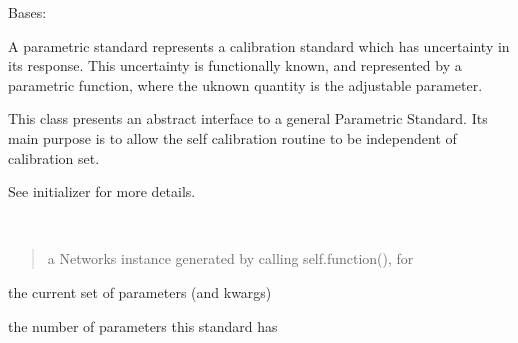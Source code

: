 \documentclass[letterpaper,10pt,english]{sphinxmanual}
\begin{document}
\begin{fulllineitems}
\label{api/mwavepy.calibration.parametricStandard:mwavepy.calibration.parametricStandard.parametricStandard.ParametricStandard}
Bases: 

\begin{fulllineitems}
\label{api/mwavepy.calibration.parametricStandard:mwavepy.calibration.parametricStandard.parametricStandard.ParametricStandard.INF}
A parametric standard represents a calibration standard which
has uncertainty in its response. This uncertainty is functionally
known, and      represented by a parametric function, where the
uknown quantity is the adjustable parameter.

This class presents an abstract interface to a general Parametric
Standard. Its main purpose is to allow the self calibration routine
to be independent of calibration set.

See initializer for more
details.

\end{fulllineitems}


\begin{fulllineitems}
\label{api/mwavepy.calibration.parametricStandard:mwavepy.calibration.parametricStandard.parametricStandard.ParametricStandard.network}~\begin{quote}

a Networks instance generated by calling self.function(), for
\end{quote}

the current set of parameters (and kwargs)

\end{fulllineitems}


\begin{fulllineitems}
\label{api/mwavepy.calibration.parametricStandard:mwavepy.calibration.parametricStandard.parametricStandard.ParametricStandard.number_of_parameters}
the number of parameters this standard has


\end{fulllineitems}
\end{fulllineitems}
\end{document}
